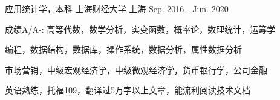 

\begin{cventries}

  \cventry
    {应用统计学，本科} %
    {上海财经大学} %
    {上海} %
    {Sep. 2016 - Jun. 2020} %
    {
      \begin{cvitems} %
        \item {成绩A/A-:   高等代数，数学分析，实变函数，概率论，数理统计，运筹学}
        \item {编程，数据结构，数据库，操作系统，数据分析，属性数据分析}
        \item {市场营销，中级宏观经济学，中级微观经济学，货币银行学，公司金融}
        \item {英语熟练，托福109，翻译过5万字以上文章，能流利阅读技术文档}
      \end{cvitems}
    }

\end{cventries}
